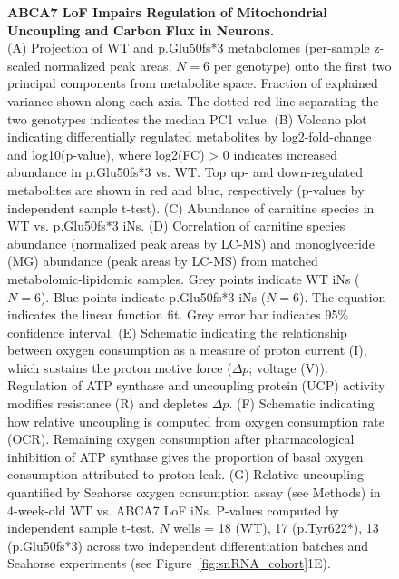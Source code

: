 \begin{figure}[ht]
    \centering
    \caption{
        \textbf{ABCA7 LoF Impairs Regulation of Mitochondrial Uncoupling and Carbon Flux in Neurons.}\\[1ex]
        (A) Projection of WT and p.Glu50fs*3 metabolomes (per-sample z-scaled normalized peak areas; $N=6$ per genotype) onto the first two principal components from metabolite space. Fraction of explained variance shown along each axis. The dotted red line separating the two genotypes indicates the median PC1 value. 
        (B) Volcano plot indicating differentially regulated metabolites by log2-fold-change and log10(p-value), where log2(FC) > 0 indicates increased abundance in p.Glu50fs*3 vs. WT. Top up- and down-regulated metabolites are shown in red and blue, respectively (p-values by independent sample t-test). 
        (C) Abundance of carnitine species in WT vs. p.Glu50fs*3 iNs. 
        (D) Correlation of carnitine species abundance (normalized peak areas by LC-MS) and monoglyceride (MG) abundance (peak areas by LC-MS) from matched metabolomic-lipidomic samples. Grey points indicate WT iNs ($N=6$). Blue points indicate p.Glu50fs*3 iNs ($N=6$). The equation indicates the linear function fit. Grey error bar indicates 95\% confidence interval. 
        (E) Schematic indicating the relationship between oxygen consumption as a measure of proton current (I), which sustains the proton motive force ($\Delta p$; voltage (V)). Regulation of ATP synthase and uncoupling protein (UCP) activity modifies resistance (R) and depletes $\Delta p$. 
        (F) Schematic indicating how relative uncoupling is computed from oxygen consumption rate (OCR). Remaining oxygen consumption after pharmacological inhibition of ATP synthase gives the proportion of basal oxygen consumption attributed to proton leak. 
        (G) Relative uncoupling quantified by Seahorse oxygen consumption assay (see Methods) in 4-week-old WT vs. ABCA7 LoF iNs. P-values computed by independent sample t-test. $N$ wells = 18 (WT), 17 (p.Tyr622*), 13 (p.Glu50fs*3) across two independent differentiation batches and Seahorse experiments (see Figure~\ref{fig:snRNA_cohort}1E). 
}
\end{figure}
